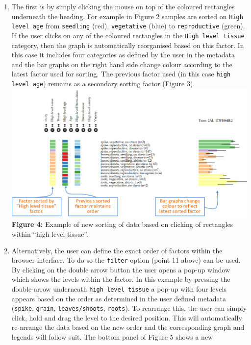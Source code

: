 \begin{enumerate}
\def\labelenumi{\arabic{enumi}.}
\itemsep1pt\parskip0pt
\item
  The first is by simply clicking the mouse on top of the coloured
  rectangles underneath the heading. For example in Figure 2 samples are
  sorted on \lstinline!High level age! from \lstinline!seedling! (red),
  \lstinline!vegetative! (blue) to \lstinline!reproductive! (green). If
  the user clicks on any of the coloured rectangles in the
  \lstinline!High level tissue! category, then the graph is
  automatically reorganised based on this factor. In this case it
  includes four categories as defined by the user in the metadata and
  the bar graphs on the right hand side change colour according to the
  latest factor used for sorting. The previous factor used (in this case
  \lstinline!high level age!) remains as a secondary sorting factor
  (Figure 3). \includegraphics{images/Figure3.png} \textbf{Figure 4:}
  Example of new sorting of data based on clicking of rectangles within
  ``high level tissue''.
\item
  Alternatively, the user can define the exact order of factors within
  the browser interface. To do so the \lstinline!filter! option (point
  11 above) can be used. By clicking on the double arrow button the user
  opens a pop-up window which shows the levels within the factor. In
  this example by pressing the double-arrow underneath
  \lstinline!high level tissue! a pop-up with four levels appears based
  on the order as determined in the user defined metadata
  (\lstinline!spike!, \lstinline!grain!, \lstinline!leaves/shoots!,
  \lstinline!roots!). To rearrange this, the user can simply click, hold
  and drag the level to the desired position. This will automatically
  re-arrange the data based on the new order and the corresponding graph
  and legends will follow suit. The bottom panel of Figure 5 shows a new

\end{enumerate}
